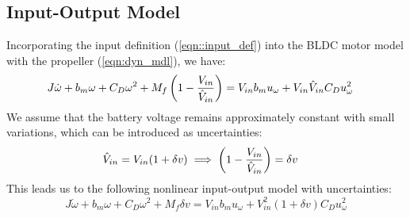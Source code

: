 \subsection{Input-Output Model}
Incorporating the input definition (\ref{eqn::input_def}) into the BLDC motor model with the propeller (\ref{eqn:dyn_mdl}), we have:
{\small
\begin{align}
    &J \dot \omega + b_m \omega + C_D \omega^2 + M_f \left( 1 - \frac{V_{in}}{\hat V_{in}} \right) = V_{in} b_m u_\omega + V_{in} \hat V_{in} C_D u_\omega^2
\end{align}
}
We assume that the battery voltage remains approximately constant with small variations, which can be introduced as uncertainties:
\begin{align}
    \hat V_{in} &= V_{in} ( 1 + \delta v)
    \implies \left( 1 - \frac{V_{in}}{\hat V_{in}} \right) = \delta v
\end{align}
This leads us to the following nonlinear input-output model with uncertainties:
\begin{equation}\label{eqn::nl_model}
    J \dot \omega + b_m \omega + C_D \omega^2 + M_f \delta v = V_{in} b_m u_\omega + V_{in}^2 (1 + \delta v) C_D u_\omega^2
\end{equation}
